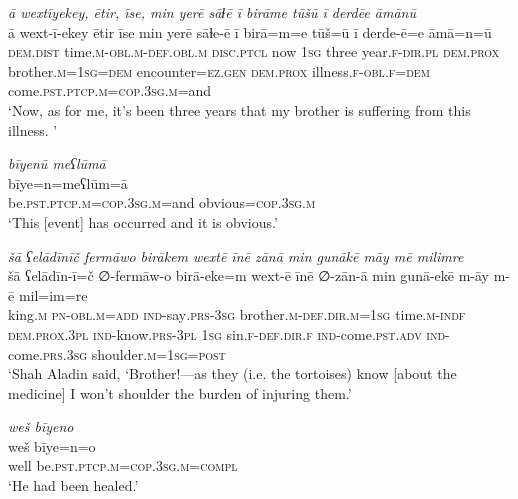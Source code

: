 \ea \label{DG.38}
\textit{ā wextīyekey, ētir, īse, min yerē sāɫē ī birāme tūšū ī derdēe āmānū} \\ 
\gll ā wext-ī-ekey ētir īse min yerē sāɫe-ē ī birā=m=e tūš=ū ī derde-ē=e āmā=n=ū \\ 
 \textsc{dem.dist} time\textsc{.m}\textsc{-obl}\textsc{.m}\textsc{-def}\textsc{.obl}\textsc{.m} \textsc{disc.ptcl} now \textsc{1sg} three year\textsc{\textsc{.f}}\textsc{-dir}\textsc{.pl} \textsc{dem.prox} brother\textsc{.m}\textsc{=1sg}\textsc{=dem} encounter\textsc{=ez}\textsc{.gen} \textsc{dem.prox} illness\textsc{\textsc{.f}}\textsc{-obl}\textsc{\textsc{.f}}\textsc{=dem} come\textsc{.pst}\textsc{.ptcp}\textsc{.m}\textsc{=cop}\textsc{.3sg}\textsc{.m}=and \\ 
\glt `Now, as for me, it’s been three years that my brother is suffering from this illness. '
\z 
 
\ea \label{DG.63}
\textit{bīyenū meʕlūmā} \\ 
\gll bīye=n=meʕlūm=ā \\ 
 be\textsc{.pst}\textsc{.ptcp}\textsc{.m}\textsc{=cop}\textsc{.3sg}\textsc{.m}=and obvious\textsc{=cop}\textsc{.3sg}\textsc{.m} \\ 
\glt `This [event] has occurred and it is obvious.'
\z 
 
\ea \label{DG.67}
\textit{šā ʕelādīnīč fermāwo birākem wextē īnē zānā min gunākē māy mē milimre} \\ 
\gll šā ʕelādīn-ī=č ∅-fermāw-o birā-eke=m wext-ē īnē ∅-zān-ā min gunā-ekē m-āy m-ē mil=im=re \\ 
 king\textsc{.m} \textsc{pn}\textsc{-obl}\textsc{.m}\textsc{=add} \textsc{ind-}say\textsc{.prs}\textsc{-3sg} brother\textsc{.m}\textsc{-def}\textsc{.dir}\textsc{.m}\textsc{=1sg} time\textsc{.m}\textsc{-indf} \textsc{dem.prox}\textsc{.3pl} \textsc{ind-}know\textsc{.prs}\textsc{-3pl} \textsc{1sg} sin\textsc{\textsc{.f}}\textsc{-def}\textsc{.dir}\textsc{\textsc{.f}} \textsc{ind-}come\textsc{.pst}\textsc{.adv} \textsc{ind-}come\textsc{.prs}\textsc{.3sg} shoulder\textsc{.m}\textsc{=1sg}\textsc{=\textsc{post}} \\ 
\glt `Shah Aladin said, ‘Brother!—as they (i.e. the tortoises) know [about the medicine] I won’t shoulder the burden of injuring them.'
\z 
 
\ea \label{DG.71}
\textit{weš bīyeno} \\ 
\gll weš bīye=n=o \\ 
 well be\textsc{.pst}\textsc{.ptcp}\textsc{.m}\textsc{=cop}\textsc{.3sg}\textsc{.m}\textsc{=compl} \\ 
\glt `He had been healed.'
\z 
 
